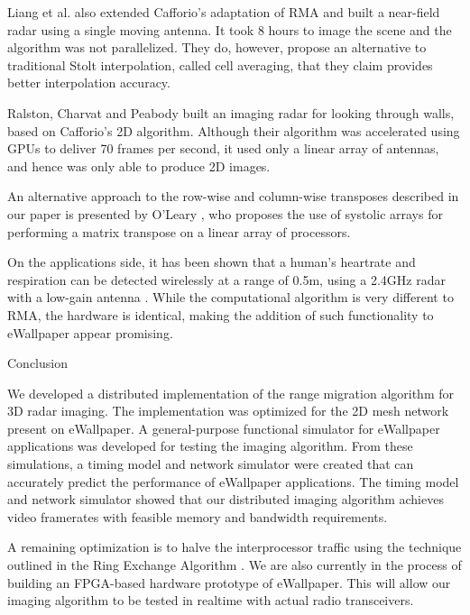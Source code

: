 \documentclass[twocolumn]{article}
\makeatletter
\def\section{\@startsection{section}{1}{\z@}{24pt plus 2 pt
minus 2 pt} {12pt plus 2pt minus 2pt}{\large\bf}}
\makeatother
\begin{document}
Liang et al. \cite{near-field-3d-stolt} also extended Cafforio's adaptation of RMA and built a near-field radar using a single moving antenna. It took 8 hours to image the scene and the algorithm was not parallelized. They do, however, propose an alternative to traditional Stolt interpolation, called cell averaging, that they claim provides better interpolation accuracy.

Ralston, Charvat and Peabody \cite{thru-wall-mimo} built an imaging radar for looking through walls, based on Cafforio's 2D algorithm. Although their algorithm was accelerated using GPUs to deliver 70 frames per second, it used only a linear array of antennas, and hence was only able to produce 2D images.

An alternative approach to the row-wise and column-wise transposes described in our paper is presented by O'Leary \cite{systolic-arrays-transpose}, who proposes the use of systolic arrays for performing a matrix transpose on a linear array of processors.

On the applications side, it has been shown that a human's heartrate and respiration can be detected wirelessly at a range of 0.5m, using a 2.4GHz radar with a low-gain antenna \cite{bioradar}. While the computational algorithm is very different to RMA, the hardware is identical, making the addition of such functionality to eWallpaper appear promising.

\section{Conclusion}

We developed a distributed implementation of the range migration algorithm for 3D radar imaging. The implementation was optimized for the 2D mesh network present on eWallpaper. A general-purpose functional simulator for eWallpaper applications was developed for testing the imaging algorithm. From these simulations, a timing model and network simulator were created that can accurately predict the performance of eWallpaper applications. The timing model and network simulator showed that our distributed imaging algorithm achieves video framerates with feasible memory and bandwidth requirements.

A remaining optimization is to halve the interprocessor traffic using the technique outlined in the Ring Exchange Algorithm \cite{efficient-transposition}. We are also currently in the process of building an FPGA-based hardware prototype of eWallpaper. This will allow our imaging algorithm to be tested in realtime with actual radio transceivers.

{\small

}
\end{document}
